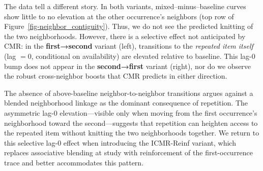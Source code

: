 \documentclass[
  man,
  floatsintext,
  longtable,
  nolmodern,
  notxfonts,
  notimes,
  draftfirst,
  colorlinks=true,linkcolor=blue,citecolor=blue,urlcolor=blue]{apa7}
\begin{document}
The data tell a different story. In both variants,
mixed--minus--baseline curves show little to no elevation at the other
occurrence's neighbors (top row of
Figure~\ref{fig-neighbor_contiguity}). Thus, we do not see the predicted
knitting of the two neighborhoods. However, there is a selective effect
not anticipated by CMR: in the \textbf{first→second} variant (left),
transitions to the \emph{repeated item itself} (lag \(=0\), conditional
on availability) are elevated relative to baseline. This lag-0 bump does
not appear in the \textbf{second→first} variant (right), nor do we
observe the robust cross-neighbor boosts that CMR predicts in either
direction.

The absence of above-baseline neighbor-to-neighbor transitions argues
against a blended neighborhood linkage as the dominant consequence of
repetition. The asymmetric lag-0 elevation---visible only when moving
from the first occurrence's neighborhood toward the second---suggests
that repetition can heighten access to the repeated item without
knitting the two neighborhoods together. We return to this selective
lag-0 effect when introducing the ICMR-Reinf variant, which replaces
associative blending at study with reinforcement of the first-occurrence
trace and better accommodates this pattern.
\end{document}
